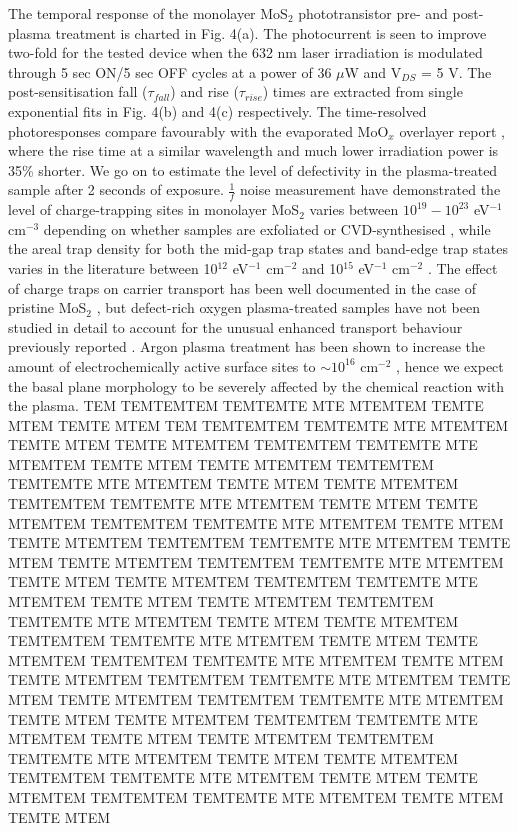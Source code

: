 \documentclass[%
 reprint,
superscriptaddress,
 amsmath,amssymb,
 aps,
prb,
]{revtex4-1}
\begin{document}
\indent The temporal response of the monolayer MoS$_2$ phototransistor pre- and post-plasma treatment is charted in Fig. 4(a). The photocurrent is seen to improve two-fold for the tested device when the 632 nm laser irradiation is modulated through 5 sec ON/5 sec OFF cycles at a power of 36 $\mu$W and V$_{DS}$ = 5 V. The post-sensitisation fall ($\tau_{fall}$) and rise ($\tau_{rise}$) times are extracted from single exponential fits in Fig. 4(b) and 4(c) respectively. The time-resolved photoresponses compare favourably with the evaporated MoO$_x$ overlayer report \cite{Yoo2017}, where the rise time at a similar wavelength and much lower irradiation power is 35\% shorter.  \newline
\indent We go on to estimate the level of defectivity in the plasma-treated sample after 2 seconds of exposure. $\frac{1}{f}$ noise measurement have demonstrated the level of charge-trapping sites in monolayer MoS$_2$ varies between $10^{19} - 10^{23}$ eV$^{-1}$ cm$^{-3}$ depending on whether samples are exfoliated or CVD-synthesised \cite{renteria2014low,kim2017analysis}, while the areal trap density for both the mid-gap trap states and band-edge trap states varies in the literature between 10$^{12}$ eV$^{-1}$ cm$^{-2}$ and 10$^{15}$ eV$^{-1}$ cm$^{-2}$ \cite{zhu2014electronic,yuan2017pbti}. The effect of charge traps on carrier transport has been well documented in the case of pristine MoS$_2$ \cite{yu2016realization,yu2017analyzing}, but defect-rich oxygen plasma-treated samples have not been studied in detail to account for the unusual enhanced transport behaviour previously reported \cite{jadwiszczak2017oxide, nan2017improving}. Argon plasma treatment has been shown to increase the amount of electrochemically active surface sites to $\sim 10^{16}$ cm$^{-2}$ \cite{tao2015plasma}, hence we expect the basal plane morphology to be severely affected by the chemical reaction with the plasma. \newline
\indent TEM TEMTEMTEM TEMTEMTE MTE MTEMTEM TEMTE MTEM TEMTE MTEM TEM TEMTEMTEM TEMTEMTE MTE MTEMTEM TEMTE MTEM TEMTE MTEMTEM TEMTEMTEM TEMTEMTE MTE MTEMTEM TEMTE MTEM TEMTE MTEMTEM TEMTEMTEM TEMTEMTE MTE MTEMTEM TEMTE MTEM TEMTE MTEMTEM TEMTEMTEM TEMTEMTE MTE MTEMTEM TEMTE MTEM TEMTE MTEMTEM TEMTEMTEM TEMTEMTE MTE MTEMTEM TEMTE MTEM TEMTE MTEMTEM TEMTEMTEM TEMTEMTE MTE MTEMTEM TEMTE MTEM TEMTE MTEMTEM TEMTEMTEM TEMTEMTE MTE MTEMTEM TEMTE MTEM TEMTE MTEMTEM TEMTEMTEM TEMTEMTE MTE MTEMTEM TEMTE MTEM TEMTE MTEMTEM TEMTEMTEM TEMTEMTE MTE MTEMTEM TEMTE MTEM TEMTE MTEMTEM TEMTEMTEM TEMTEMTE MTE MTEMTEM TEMTE MTEM TEMTE MTEMTEM TEMTEMTEM TEMTEMTE MTE MTEMTEM TEMTE MTEM TEMTE MTEMTEM TEMTEMTEM TEMTEMTE MTE MTEMTEM TEMTE MTEM TEMTE MTEMTEM TEMTEMTEM TEMTEMTE MTE MTEMTEM TEMTE MTEM TEMTE MTEMTEM TEMTEMTEM TEMTEMTE MTE MTEMTEM TEMTE MTEM TEMTE MTEMTEM TEMTEMTEM TEMTEMTE MTE MTEMTEM TEMTE MTEM TEMTE MTEMTEM TEMTEMTEM TEMTEMTE MTE MTEMTEM TEMTE MTEM TEMTE MTEMTEM TEMTEMTEM TEMTEMTE MTE MTEMTEM TEMTE MTEM TEMTE MTEM\newline
\end{document}
